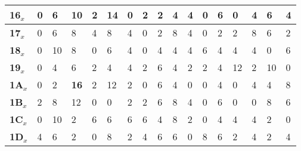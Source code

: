 \begin{longtable}[c]{|l|l|l|l|l|l|l|l|l|l|l|l|l|l|l|l|l|}
\textbf{16$_x$} & 0              & 6              & 10             & 2              & 14             & 0              & 2              & 2              & 4              & 4              & 0              & 6              & 0              & 4              & 6              & 4              \\ \hline
\textbf{17$_x$} & 0              & 6              & 8              & 4              & 8              & 4              & 0              & 2              & 8              & 4              & 0              & 2              & 2              & 8              & 6              & 2              \\ \hline
\textbf{18$_x$} & 0              & 10             & 8              & 0              & 6              & 4              & 0              & 4              & 4              & 4              & 6              & 4              & 4              & 4              & 0              & 6              \\ \hline
\textbf{19$_x$} & 0              & 4              & 6              & 2              & 4              & 4              & 2              & 6              & 4              & 2              & 2              & 4              & 12             & 2              & 10             & 0              \\ \hline
\textbf{1A$_x$} & 0              & 2              & \textbf{16}             & 2              & 12             & 2              & 0              & 6              & 4              & 0              & 0              & 4              & 0              & 4              & 4              & 8              \\ \hline
\textbf{1B$_x$} & 2              & 8              & 12             & 0              & 0              & 2              & 2              & 6              & 8              & 4              & 0              & 6              & 0              & 0              & 8              & 6              \\ \hline
\textbf{1C$_x$} & 0              & 10             & 2              & 6              & 6              & 6              & 6              & 4              & 8              & 2              & 0              & 4              & 4              & 4              & 2              & 0              \\ \hline
\textbf{1D$_x$} & 4              & 6              & 2              & 0              & 8              & 2              & 4              & 6              & 6              & 0              & 8              & 6              & 2              & 4              & 2              & 4              \\ \hline

\end{longtable}
